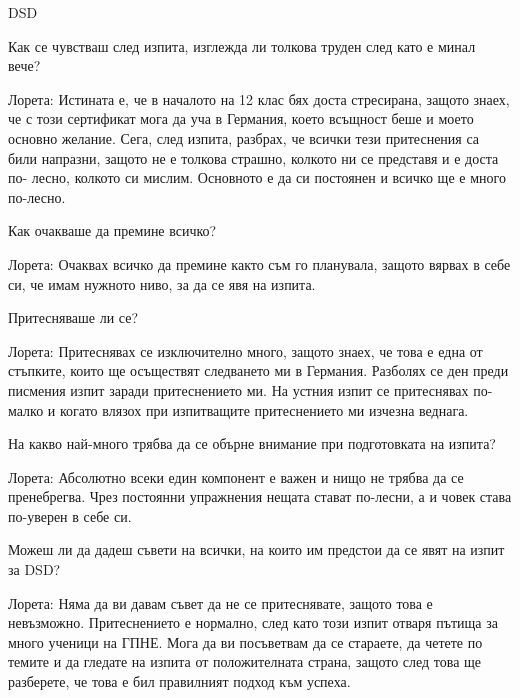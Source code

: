 \begin{multicols}{3}DSD


Как се чувстваш след изпита, изглежда ли толкова труден след като е минал вече?

Лорета: Истината е, че в началото на 12 клас бях доста стресирана, защото знаех, че с този сертификат мога да уча в Германия, което всъщност беше и моето основно желание. Сега, след изпита, разбрах, че всички тези притеснения са били напразни, защото не е толкова страшно, колкото ни се представя и е доста по- лесно, колкото си мислим. Основното е да си постоянен и всичко ще е много по-лесно.

Как очакваше да премине всичко? 

Лорета:  Очаквах всичко да премине както съм го планувала, защото вярвах в себе си, че имам нужното ниво, за да се явя на изпита.

Притесняваше ли се?

Лорета: Притеснявах се изключително много, защото знаех, че това е една от стъпките, които ще осъществят следването ми в Германия. Разболях се ден преди писмения изпит заради притеснението ми. На устния изпит се притеснявах по-малко и когато влязох при изпитващите притеснението ми изчезна веднага.

На какво най-много трябва да се обърне внимание при подготовката на  изпита?

Лорета: Абсолютно всеки един компонент е важен и нищо не трябва да се пренебрегва. Чрез постоянни упражнения нещата стават по-лесни, а и човек става по-уверен в себе си.

Можеш ли да дадеш съвети на всички, на които им предстои да се явят на изпит за DSD?

Лорета: Няма да ви давам съвет да не се притеснявате, защото това е невъзможно. Притеснението е нормално, след като този изпит отваря пътища за много  ученици на ГПНЕ. Мога да ви посъветвам да се стараете, да четете по темите и да гледате на изпита от положителната страна, защото след това ще разберете, че това е бил правилният подход към успеха.
\closearticle
\end{multicols}
